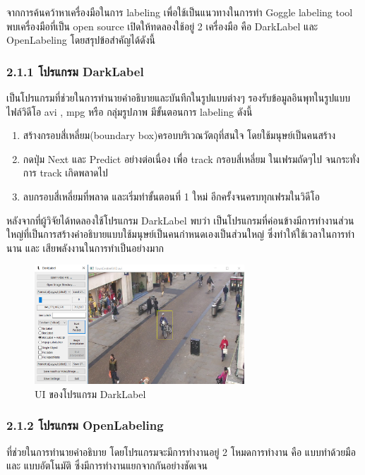 	จากการค้นคว้าหาเครื่องมือในการ labeling เพื่อใช้เป็นแนวทางในการทำ Goggle labeling tool พบเครื่องมือที่เป็น open source เปิดให้ทดลองใช้อยู่ 2 เครื่องมือ คือ DarkLabel และ OpenLabeling โดยสรุปข้อสำคัญได้ดังนี้ 

\subsubsection*{2.1.1 โปรแกรม DarkLabel}
เป็นโปรแกรมที่ช่วยในการทำนายคำอธิบายและบันทึกในรูปแบบต่างๆ รองรับข้อมูลอินพุทในรูปแบบไฟล์วิดีโอ avi , mpg หรือ กลุ่มรูปภาพ มีขั้นตอนการ labeling ดังนี้ 
\begin{enumerate}
	\setlength\itemsep{-0.25em}
	\item สร้างกรอบสี่เหลี่ยม(boundary box)ครอบบริเวณวัตถุที่สนใจ โดยใช้มนุษย์เป็นคนสร้าง
	\item กดปุ่ม Next และ Predict อย่างต่อเนื่อง เพื่อ track กรอบสี่เหลี่ยม ในเฟรมถัดๆไป จนกระทั่งการ track เกิดพลาดไป
	\item ลบกรอบสี่เหลี่ยมที่พลาด และเริ่มทำขั้นตอนที่ 1 ใหม่ อีกครั้งจนครบทุกเฟรมในวิดีโอ
\end{enumerate}
หลังจากที่ผู้วิจัยได้ทดลองใช้โปรแกรม DarkLabel พบว่า เป็นโปรแกรมที่ค่อนข้างมีการทำงานส่วนใหญ่ที่เป็นการสร้างคำอธิบายแบบใช้มนุษย์เป็นคนกำหนดเองเป็นส่วนใหญ่ ซึ่งทำให้ใช้เวลาในการทำนาน และ เสียพลังงานในการทำเป็นอย่างมาก 


\begin{figure}[!ht]
	\centering
	\includegraphics[width=0.7\textwidth]{chapter2/images/darklabel.png}
		\caption{UI ของโปรแกรม DarkLabel}
    	\label{fig:darklabel}
\end{figure}


\clearpage
\subsubsection*{2.1.2 โปรแกรม OpenLabeling}
ที่ช่วยในการทำนายคำอธิบาย โดยโปรแกรมจะมีการทำงานอยู่ 2 โหมดการทำงาน คือ แบบทำด้วยมือ และ แบบอัตโนมัติ ซึ่งมีการทำงานแยกจากกันอย่างชัดเจน 

